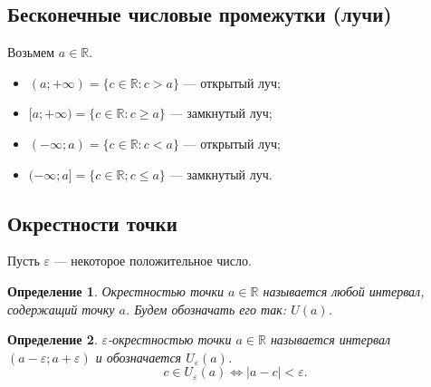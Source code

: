 \documentclass[a4paper,12pt]{article} %
\newtheorem{definition}{Определение}[section]
\theoremstyle{remark}
\theoremstyle{definition}
\begin{document}
\subsection{Бесконечные числовые промежутки (лучи)}
Возьмем $a\in \mathbb{R}$.
\begin{itemize}
	\item $(a; +\infty) = \{c \in \mathbb{R} : c > a\} $ --- открытый луч;
	\item $[a; +\infty) = \{c \in \mathbb{R} : c \ge a\} $ --- замкнутый луч;
	\item $(-\infty; a) = \{c\in \mathbb{R}:c<a\} $ --- открытый луч;
	\item $(-\infty; a] = \{c \in \mathbb{R}; c \le a\} $ --- замкнутый луч.
\end{itemize}


\subsection{Окрестности точки}
Пусть $\varepsilon$ --- некоторое положительное число.
\begin{definition}
	Окрестностью точки $a \in \mathbb{R}$ называется любой интервал, содержащий точку $a$. Будем обозначать его так: $U(a)$.
\end{definition}
\begin{center}
\end{center}

\begin{definition}
	$\varepsilon$-окрестностью точки $a\in \mathbb{R}$ называется интервал $(a-\varepsilon;a+\varepsilon)$ и обозначается $U_\varepsilon(a)$.
	\[
	c\in U_\varepsilon(a) \iff |a-c| < \varepsilon
	.\] 
\end{definition}
\begin{center}
\end{center}
\end{document}
